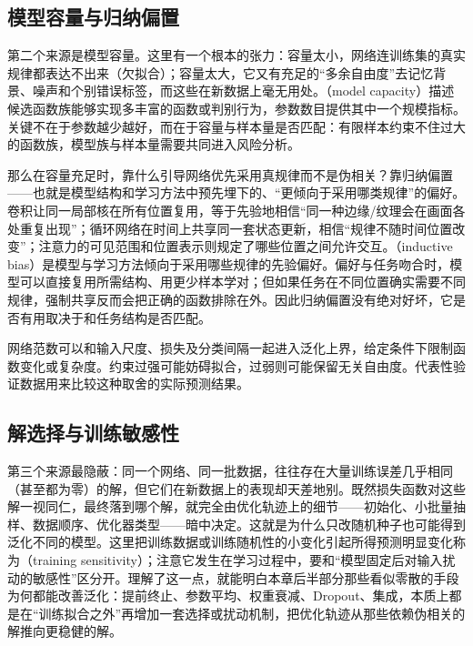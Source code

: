 \subsection{模型容量与归纳偏置}
\label{sec:generalization-capacity}

第二个来源是模型容量。这里有一个根本的张力：容量太小，网络连训练集的真实规律都表达不出来（欠拟合）；容量太大，它又有充足的“多余自由度”去记忆背景、噪声和个别错误标签，而这些在新数据上毫无用处。（model capacity）描述候选函数族能够实现多丰富的函数或判别行为，参数数目提供其中一个规模指标。关键不在于参数越少越好，而在于容量与样本量是否匹配：有限样本约束不住过大的函数族，模型族与样本量需要共同进入风险分析。

那么在容量充足时，靠什么引导网络优先采用真规律而不是伪相关？靠归纳偏置——也就是模型结构和学习方法中预先埋下的、“更倾向于采用哪类规律”的偏好。卷积让同一局部核在所有位置复用，等于先验地相信“同一种边缘/纹理会在画面各处重复出现”；循环网络在时间上共享同一套状态更新，相信“规律不随时间位置改变”；注意力的可见范围和位置表示则规定了哪些位置之间允许交互。（inductive bias）是模型与学习方法倾向于采用哪些规律的先验偏好。偏好与任务吻合时，模型可以直接复用所需结构、用更少样本学对；但如果任务在不同位置确实需要不同规律，强制共享反而会把正确的函数排除在外。因此归纳偏置没有绝对好坏，它是否有用取决于和任务结构是否匹配。

网络范数可以和输入尺度、损失及分类间隔一起进入泛化上界，给定条件下限制函数变化或复杂度。约束过强可能妨碍拟合，过弱则可能保留无关自由度。代表性验证数据用来比较这种取舍的实际预测结果。

\subsection{解选择与训练敏感性}
\label{sec:generalization-solution-selection}

第三个来源最隐蔽：同一个网络、同一批数据，往往存在大量训练误差几乎相同（甚至都为零）的解，但它们在新数据上的表现却天差地别。既然损失函数对这些解一视同仁，最终落到哪个解，就完全由优化轨迹上的细节——初始化、小批量抽样、数据顺序、优化器类型——暗中决定。这就是为什么只改随机种子也可能得到泛化不同的模型。这里把训练数据或训练随机性的小变化引起所得预测明显变化称为（training sensitivity）；注意它发生在学习过程中，要和“模型固定后对输入扰动的敏感性”区分开。理解了这一点，就能明白本章后半部分那些看似零散的手段为何都能改善泛化：提前终止、参数平均、权重衰减、Dropout、集成，本质上都是在“训练拟合之外”再增加一套选择或扰动机制，把优化轨迹从那些依赖伪相关的解推向更稳健的解。

